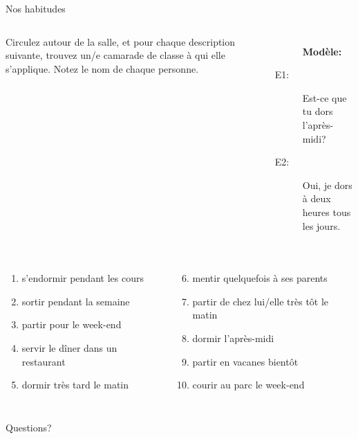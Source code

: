 \documentclass{beamer}
\begin{document}
  \begin{frame}{Nos habitudes}
    \begin{columns}
        Circulez autour de la salle, et pour chaque description suivante, trouvez un/e camarade de classe à qui elle s'applique.
        Notez le nom de chaque personne. \\
        \begin{description}
          \item[] \textbf{Modèle:}
          \item[E1:] Est-ce que tu dors l'après-midi?
          \item[E2:] Oui, je dors à deux heures tous les jours.
        \end{description}
    \end{columns}
    \vspace{0.5cm}
    \begin{columns}[t]
      \scriptsize
        \begin{enumerate}
          \item s'endormir pendant les cours
          \item sortir pendant la semaine
          \item partir pour le week-end
          \item servir le dîner dans un restaurant
          \item dormir très tard le matin
        \end{enumerate}
        \begin{enumerate}
          \setcounter{enumi}{5}
          \item mentir quelquefois à ses parents
          \item partir de chez lui/elle très tôt le matin
          \item dormir l'après-midi
          \item partir en vacanes bientôt
          \item courir au parc le week-end
        \end{enumerate}
    \end{columns}
  \end{frame}

  \begin{frame}{}
    \begin{center}
      \Large Questions?
    \end{center}
  \end{frame}
\end{document}
